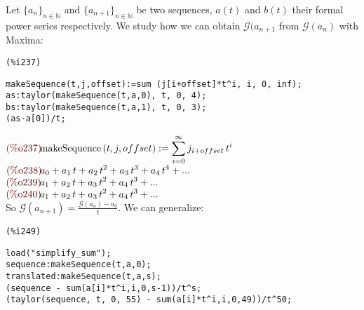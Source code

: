 Let $\{a_n\}_{n\in\mathbb{N} }$ and $\{a_{n+1}\}_{n\in\mathbb{N} } $
be two sequences, $a(t)$ and $b(t)$ their formal power series
respectively. We study how we can obtain $\mathcal{G}(a_{n+1} $ from
$\mathcal{G} (a_n)$ with Maxima:\\
\noindent
\begin{minipage}[t]{8ex}{\color{red}\bf
\begin{verbatim}
(%i237) 
\end{verbatim}}
\end{minipage}
\begin{minipage}[t]{\textwidth}{\color{blue}
\begin{verbatim}
makeSequence(t,j,offset):=sum (j[i+offset]*t^i, i, 0, inf);
as:taylor(makeSequence(t,a,0), t, 0, 4);
bs:taylor(makeSequence(t,a,1), t, 0, 3);
(as-a[0])/t;
\end{verbatim}}
\end{minipage}
\begin{math}\displaystyle
\parbox{8ex}{\color{labelcolor}(\%o237) }
\mathrm{makeSequence}\left( t,j,offset\right) :=\sum_{i=0}^{\infty }{j}_{i+offset}\,{t}^{i}
\end{math}\\
\begin{math}\displaystyle
\parbox{8ex}{\color{labelcolor}(\%o238) }
{a}_{0}+{a}_{1}\,t+{a}_{2}\,{t}^{2}+{a}_{3}\,{t}^{3}+{a}_{4}\,{t}^{4}+...
\end{math}\\
\begin{math}\displaystyle
\parbox{8ex}{\color{labelcolor}(\%o239) }
{a}_{1}+{a}_{2}\,t+{a}_{3}\,{t}^{2}+{a}_{4}\,{t}^{3}+...
\end{math}\\
\begin{math}\displaystyle
\parbox{8ex}{\color{labelcolor}(\%o240) }
{a}_{1}+{a}_{2}\,t+{a}_{3}\,{t}^{2}+{a}_{4}\,{t}^{3}+...
\end{math}\\
So $\mathcal{G}(a_{n+1}) =  \frac{\mathcal{G} (a_n) - a_0}{t}$. We can
generalize:\\
\noindent
\begin{minipage}[t]{8ex}{\color{red}\bf
\begin{verbatim}
(%i249) 
\end{verbatim}}
\end{minipage}
\begin{minipage}[t]{\textwidth}{\color{blue}
\begin{verbatim}
load("simplify_sum");
sequence:makeSequence(t,a,0);
translated:makeSequence(t,a,s);
(sequence - sum(a[i]*t^i,i,0,s-1))/t^s;
(taylor(sequence, t, 0, 55) - sum(a[i]*t^i,i,0,49))/t^50;
\end{verbatim}}
\end{minipage}
